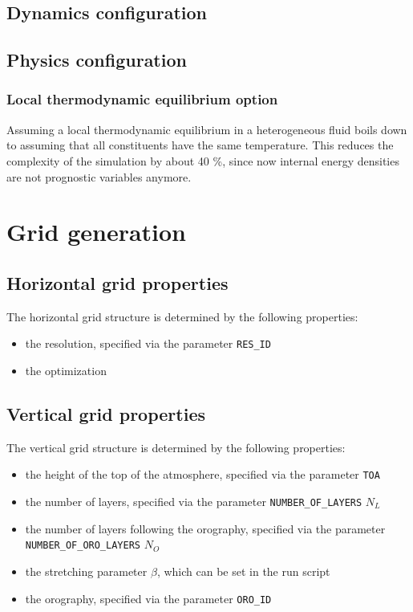 \documentclass[10pt]{report}
\begin{document}
\section{Dynamics configuration}
\label{sec:dynamics_configuration}

\section{Physics configuration}
\label{sec:physics_configuration}

\subsection{Local thermodynamic equilibrium option}
\label{sec:local_thermodynamic_equilibrium_option}

Assuming a local thermodynamic equilibrium in a heterogeneous fluid boils down to assuming that all constituents have the same temperature. This reduces the complexity of the simulation by about 40 \%, since now internal energy densities are not prognostic variables anymore.

\chapter{Grid generation}
\label{chap:grid_generation}

\section{Horizontal grid properties}
\label{sec:horizontal_grid_properties}

The horizontal grid structure is determined by the following properties:

\begin{itemize}
\item the resolution, specified via the parameter \texttt{RES\_ID}
\item the optimization
\end{itemize}

\section{Vertical grid properties}
\label{sec:vertical_grid_properties}

The vertical grid structure is determined by the following properties:

\begin{itemize}
\item the height of the top of the atmosphere, specified via the parameter \texttt{TOA}
\item the number of layers, specified via the parameter \texttt{NUMBER\_OF\_LAYERS} $N_L$
\item the number of layers following the orography, specified via the parameter \texttt{NUMBER\_OF\_ORO\_LAYERS} $N_O$
\item the stretching parameter $\beta$, which can be set in the run script
\item the orography, specified via the parameter \texttt{ORO\_ID}
\end{itemize}
\end{document}
